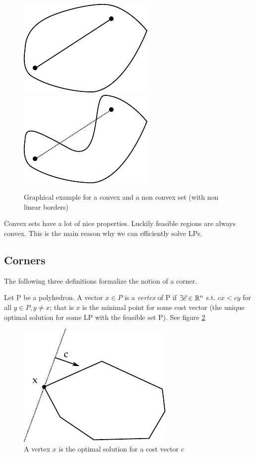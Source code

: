 \begin{figure}[hbt]
\begin{center}
\includegraphics{./images/convex.pdf}\hspace{2cm}
\includegraphics{./images/notConvex.pdf}
\end{center}
\caption{Graphical example for a convex and a non convex set (with non linear borders)}
\label{Fig:convexNotConvex}
\end{figure}

Convex sets have a lot of nice properties. Luckily feasible regions are always convex. This is the main reason why we can efficiently solve LPs. 

\subsection*{Corners}
The following three definitions formalize the notion of a corner.

\begin{Def}[Vertex]\label{Def:Vertex} Let P be a polyhedron. A vector $x\in P$ is a \emph{vertex} of P if $\exists \vec c\in \mathbb{R}^n$
 s.t. $cx < cy$ for all $y\in P, y \neq x $; that is $x$ is the minimal point for some cost vector (the unique optimal solution for some LP with the feasible set P). See figure \ref{Fig:vertex}
\end{Def}

\begin{figure}[hbt]
\begin{center}
\includegraphics{./images/vertex.pdf}
\end{center}
\caption{A vertex $x$ is the optimal solution for a cost vector $c$}
\label{Fig:vertex}
\end{figure}

